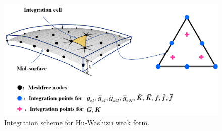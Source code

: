 \begin{figure}[!ht]
\centering
\includegraphics[width=\textwidth]{figures/2}
\caption{Integration scheme for Hu-Washizu weak form.}\label{fig2}
\end{figure}


